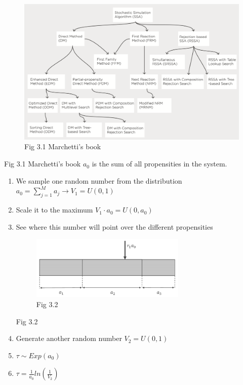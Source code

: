 \begin{figure}
  \centering
  \includegraphics[width=\textwidth]{tree_methods.png}
  \caption{Fig 3.1 Marchetti's book}
\end{figure}

Fig 3.1 Marchetti's book $a_0$ is the sum of all propensities in the system.

\begin{enumerate}
  \def\labelenumi{\arabic{enumi}.}
  \item We sample one random number from the distribution $a_0 = \sum_{j=1}^{M}{a_j}\rightarrow V_1=U(0,1)$
  \item Scale it to the maximum $V_1 \cdot a_0 =U(0,a_0)$
  \item See where this number will point over the different propensities

  \begin{figure}
    \centering
    \includegraphics[width=0.7\textwidth]{boundaries.png}
    \caption{Fig 3.2}
  \end{figure}

    Fig 3.2
  \item Generate another random number $V_2 =U(0,1)$ \item $\tau \sim Exp(a_0)$ \item $\tau = \frac{1}{a_0}ln(\frac{1}{V_2})$
\end{enumerate}

